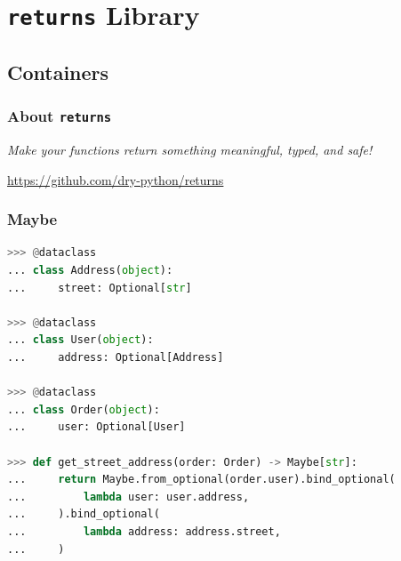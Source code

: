 \documentclass[envcountsect,10pt]{beamer}
\begin{document}
\section{\texttt{returns} Library}

\subsection{Containers}

\begin{frame}[fragile]
    \frametitle{About \texttt{returns}}

    \begin{center}
        \textit{Make your functions return something meaningful, typed, and safe!}

        \vspace{2em}

        \url{https://github.com/dry-python/returns}
    \end{center}


\end{frame}

\begin{frame}[fragile]
    \frametitle{Maybe}

    \begin{lstlisting}[language=Python]
>>> @dataclass
... class Address(object):
...     street: Optional[str]

>>> @dataclass
... class User(object):
...     address: Optional[Address]

>>> @dataclass
... class Order(object):
...     user: Optional[User]

>>> def get_street_address(order: Order) -> Maybe[str]:
...     return Maybe.from_optional(order.user).bind_optional(
...         lambda user: user.address,
...     ).bind_optional(
...         lambda address: address.street,
...     )
    \end{lstlisting}

\end{frame}
\end{document}
